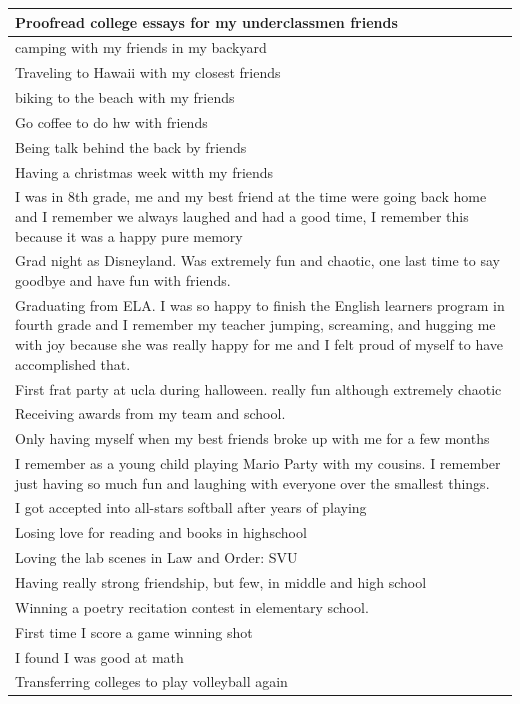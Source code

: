 \documentclass[
  .7em,
  letterpaper,
  DIV=11,
  numbers=noendperiod]{scrartcl}
\begin{document}
\begin{table}
\begin{tabular}{l}
\hline
Proofread college essays for my underclassmen friends\\
\hline
camping with my friends in my backyard\\
\hline
Traveling to Hawaii with my closest friends\\
\hline
biking to the beach with my friends\\
\hline
Go coffee to do hw with friends\\
\hline
Being talk behind the back by friends\\
\hline
Having a christmas week witth my friends\\
\hline
I was in 8th grade, me and my best friend at the time were going back home and I remember we always laughed and had a good time, I remember this because it was a happy pure memory\\
\hline
Grad night as Disneyland. Was extremely fun and chaotic, one last time to say goodbye and have fun with friends.\\
\hline
Graduating from ELA. I was so happy to finish the English learners program in fourth grade and I remember my teacher jumping, screaming, and hugging me with joy because she was really happy for me and I felt proud of myself to have accomplished that.\\
\hline
First frat party at ucla during halloween. really fun although extremely chaotic\\
\hline
Receiving awards from my team and school.\\
\hline
Only having myself when my best friends broke up with me for a few months\\
\hline
I remember as a young child playing Mario Party with my cousins. I remember just having so much fun and laughing with everyone over the smallest things.\\
\hline
I got accepted into all-stars softball after years of playing\\
\hline
Losing love for reading and books in highschool\\
\hline
Loving the lab scenes in Law and Order: SVU\\
\hline
Having really strong friendship, but few, in middle and high school\\
\hline
Winning a poetry recitation contest in elementary school.\\
\hline
First time I score a game winning shot\\
\hline
I found I was good at math\\
\hline
Transferring colleges to play volleyball again\\

\end{tabular}
\end{table}
\end{document}

